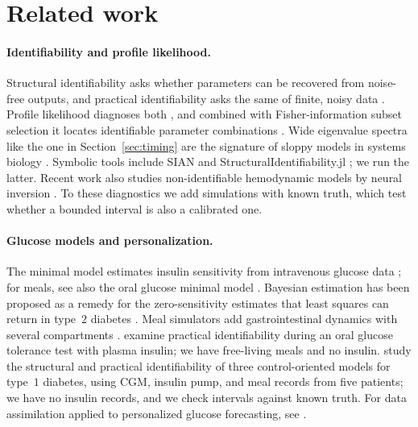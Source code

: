 \section{Related work}
\label{sec:related}

\paragraph{Identifiability and profile likelihood.}
Structural identifiability asks whether parameters can be recovered from noise-free outputs, and practical identifiability asks the same of finite, noisy data \citep{bellman1970structural,rothenberg1971identification,chis2011structural,wieland2021structural}.
Profile likelihood diagnoses both \citep{raue2009structural}, and combined with Fisher-information subset selection it locates identifiable parameter combinations \citep{eisenberg2014determining}.
Wide eigenvalue spectra like the one in Section~\ref{sec:timing} are the signature of sloppy models in systems biology \citep{brown2003statistical,gutenkunst2007universally}.
Symbolic tools include SIAN \citep{hong2019sian} and StructuralIdentifiability.jl \citep{dong2023differential}; we run the latter.
Recent work also studies non-identifiable hemodynamic models by neural inversion \citep{tong2025invaert}.
To these diagnostics we add simulations with known truth, which test whether a bounded interval is also a calibrated one.

\paragraph{Glucose models and personalization.}
The minimal model estimates insulin sensitivity from intravenous glucose data \citep{bergman1979,bergman1981}; for meals, see also the oral glucose minimal model \citep{dallaman2002oral}.
Bayesian estimation has been proposed as a remedy for the zero-sensitivity estimates that least squares can return in type~$2$ diabetes \citep{pillonetto2002minimal}.
Meal simulators add gastrointestinal dynamics with several compartments \citep{dallaman2007,dallaman2014uva,cobelli2009diabetes}.
\citet{erdos2024leveraging} examine practical identifiability during an oral glucose tolerance test with plasma insulin; we have free-living meals and no insulin.
\citet{garciatirado2018identifiability} study the structural and practical identifiability of three control-oriented models for type~$1$ diabetes, using CGM, insulin pump, and meal records from five patients; we have no insulin records, and we check intervals against known truth.
For data assimilation applied to personalized glucose forecasting, see \citet{albers2017personalized}.

